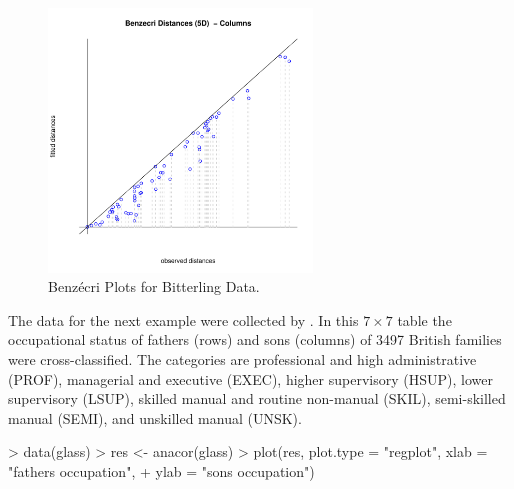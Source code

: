 \documentclass[article]{Z}
\begin{document}
\begin{figure}[h]
\begin{center}
\includegraphics[height=70mm, width=70mm]{bit5dcols.pdf}
\caption{\label{fig:bitterling} Benz\'ecri Plots for Bitterling Data.}
\end{center}
\end{figure}

The data for the next example were collected by \citet{Glass:54}. In this $7 \times 7$ table the occupational status of fathers (rows) and sons (columns) of 3497 British families were cross-classified. The categories are professional and high administrative (PROF), managerial and executive (EXEC), higher supervisory (HSUP), lower supervisory (LSUP), skilled manual and routine non-manual (SKIL), semi-skilled manual (SEMI), and unskilled manual (UNSK). 

\begin{Schunk}
\begin{Sinput}
> data(glass)
> res <- anacor(glass)
> plot(res, plot.type = "regplot", xlab = "fathers occupation", 
+     ylab = "sons occupation")
\end{Sinput}
\end{Schunk}
\end{document}
